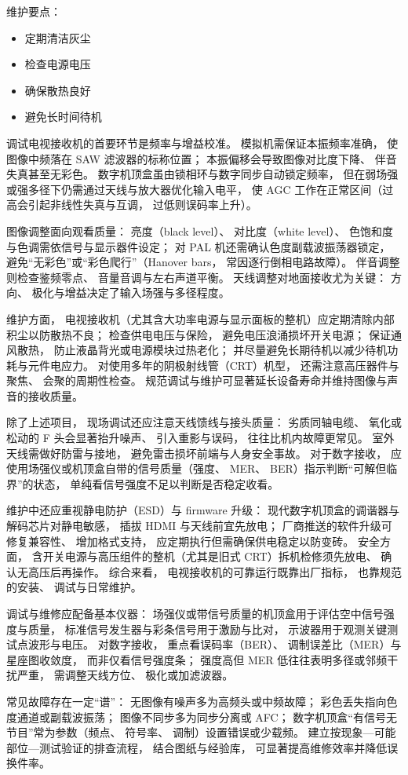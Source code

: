 维护要点：
\begin{itemize}
    \item 定期清洁灰尘
    \item 检查电源电压
    \item 确保散热良好
    \item 避免长时间待机
\end{itemize}

调试电视接收机的首要环节是频率与增益校准。
模拟机需保证本振频率准确，
使图像中频落在 SAW 滤波器的标称位置；
本振偏移会导致图像对比度下降、
伴音失真甚至无彩色。
数字机顶盒虽由锁相环与数字同步自动锁定频率，
但在弱场强或强多径下仍需通过天线与放大器优化输入电平，
使 AGC 工作在正常区间（过高会引起非线性失真与互调，
过低则误码率上升）。

图像调整面向观看质量：
亮度（black level）、
对比度（white level）、
色饱和度与色调需依信号与显示器件设定；
对 PAL 机还需确认色度副载波振荡器锁定，
避免“无彩色”或“彩色爬行”（Hanover bars，
常因逐行倒相电路故障）。
伴音调整则检查鉴频零点、
音量音调与左右声道平衡。
天线调整对地面接收尤为关键：
方向、
极化与增益决定了输入场强与多径程度。

维护方面，
电视接收机（尤其含大功率电源与显示面板的整机）应定期清除内部积尘以防散热不良；
检查供电电压与保险，
避免电压浪涌损坏开关电源；
保证通风散热，
防止液晶背光或电源模块过热老化；
并尽量避免长期待机以减少待机功耗与元件电应力。
对使用多年的阴极射线管（CRT）机型，
还需注意高压器件与聚焦、
会聚的周期性检查。
规范调试与维护可显著延长设备寿命并维持图像与声音的接收质量。

除了上述项目，
现场调试还应注意天线馈线与接头质量：
劣质同轴电缆、
氧化或松动的 F 头会显著抬升噪声、
引入重影与误码，
往往比机内故障更常见。
室外天线需做好防雷与接地，
避免雷击损坏前端与人身安全事故。
对于数字接收，
应使用场强仪或机顶盒自带的信号质量（强度、
MER、
BER）指示判断“可解但临界”的状态，
单纯看信号强度不足以判断是否稳定收看。

维护中还应重视静电防护（ESD）与 firmware 升级：
现代数字机顶盒的调谐器与解码芯片对静电敏感，
插拔 HDMI 与天线前宜先放电；
厂商推送的软件升级可修复兼容性、
增加格式支持，
应定期执行但需确保供电稳定以防变砖。
安全方面，
含开关电源与高压组件的整机（尤其是旧式 CRT）拆机检修须先放电、
确认无高压后再操作。
综合来看，
电视接收机的可靠运行既靠出厂指标，
也靠规范的安装、
调试与日常维护。

调试与维修应配备基本仪器：
场强仪或带信号质量的机顶盒用于评估空中信号强度与质量，
标准信号发生器与彩条信号用于激励与比对，
示波器用于观测关键测试点波形与电压。
对数字接收，
重点看误码率（BER）、
调制误差比（MER）与星座图收敛度，
而非仅看信号强度条；
强度高但 MER 低往往表明多径或邻频干扰严重，
需调整天线方位、
极化或加滤波器。

常见故障存在一定“谱”：
无图像有噪声多为高频头或中频故障；
彩色丢失指向色度通道或副载波振荡；
图像不同步多为同步分离或 AFC；
数字机顶盒“有信号无节目”常为参数（频点、
符号率、
调制）设置错误或少载频。
建立按现象—可能部位—测试验证的排查流程，
结合图纸与经验库，
可显著提高维修效率并降低误换件率。
